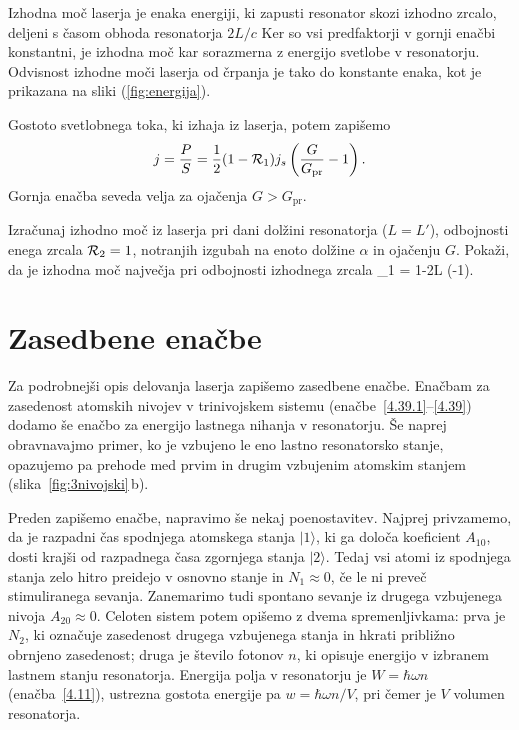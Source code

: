Izhodna moč laserja je enaka energiji, ki zapusti
resonator skozi izhodno zrcalo, deljeni s časom obhoda resonatorja $2L/c$ 
Ker so vsi predfaktorji v gornji enačbi konstantni, je izhodna moč kar sorazmerna
z energijo svetlobe v resonatorju. Odvisnost izhodne moči laserja od črpanja je 
tako do konstante enaka, kot je prikazana na sliki (\ref{fig:energija}). 

Gostoto svetlobnega toka, ki izhaja iz laserja, potem zapišemo 
\begin{equation}
 j = \frac{P}{S} = \frac{1}{2} (1-{\cal {R}}_{1}) j_s \left(\frac{G}{G_\mathrm{pr}}-1\right).
\end{equation}
Gornja enačba seveda velja za ojačenja $G>G_\mathrm{pr}$.

\begin{definition}
Izračunaj izhodno moč iz laserja pri dani dolžini resonatorja ($L=L'$), 
odbojnosti enega zrcala ${\cal {R}}_{2}=1$, 
notranjih izgubah na enoto dolžine $\alpha$ in ojačenju $G$. Pokaži, da
je izhodna moč največja pri odbojnosti izhodnega zrcala 
\beq
{}_1 = 1-2\alpha L \left(-1\right).
\eeq
\end{definition}

\section{Zasedbene enačbe}
Za podrobnejši opis delovanja laserja zapišemo zasedbene enačbe. 
Enačbam za zasedenost atomskih nivojev 
v trinivojskem sistemu (enačbe~\ref{4.39.1}--\ref{4.39}) dodamo še enačbo za 
energijo lastnega nihanja v resonatorju. Še naprej obravnavajmo primer, ko je 
vzbujeno le eno lastno resonatorsko stanje, opazujemo pa prehode  med prvim 
in drugim vzbujenim atomskim stanjem (slika~\ref{fig:3nivojski}\,b). 

Preden zapišemo enačbe, napravimo še nekaj poenostavitev. Najprej privzamemo, 
da je razpadni čas spodnjega atomskega stanja $|1\rangle$, 
ki ga določa koeficient $A_{10}$, dosti krajši od razpadnega
časa zgornjega stanja $|2\rangle$. Tedaj vsi atomi iz spodnjega stanja zelo 
hitro preidejo v osnovno stanje in $N_1 \approx 0$, če le ni preveč
stimuliranega sevanja. Zanemarimo tudi spontano sevanje iz drugega vzbujenega
nivoja $A_{20} \approx 0$. Celoten sistem potem opišemo z dvema 
spremenljivkama: prva je $N_2$, ki označuje zasedenost drugega vzbujenega
stanja in hkrati približno obrnjeno zasedenost; druga je število fotonov
$n$, ki opisuje energijo v izbranem lastnem stanju resonatorja. Energija
polja v resonatorju je $W = \hbar\omega n$ (enačba~\ref{4.11}), ustrezna
gostota energije pa $w = \hbar\omega n/V$, pri čemer je $V$ volumen resonatorja.

